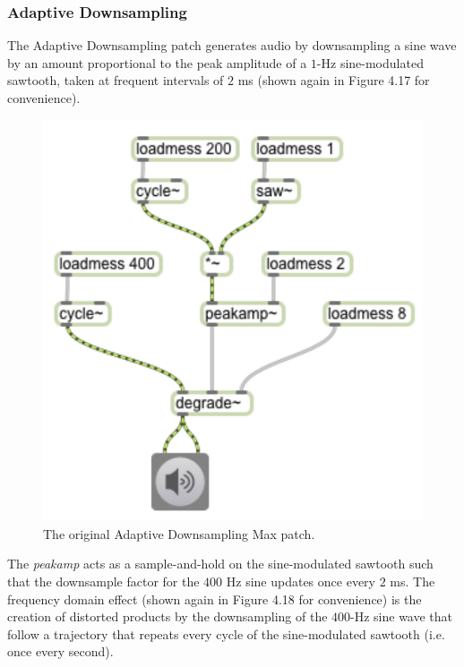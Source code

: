 \documentclass[a4paper,12pt]{report} 	%
\numberwithin{figure}{chapter}
\numberwithin{table}{chapter}
\numberwithin{equation}{chapter}
\begin{document}
\begin{flushleft}
\clearpage
\subsubsection{Adaptive Downsampling}
The Adaptive Downsampling patch generates audio by downsampling a sine wave by an amount proportional to the peak amplitude of a $1$-Hz sine-modulated sawtooth, taken at frequent intervals of $2$ ms (shown again in Figure 4.17 for convenience).
\begin{figure}[h!]
\begin{center}
\includegraphics[scale=0.8]{AdaptiveDegrade}
\caption[Original Adaptive Downsampling Max Patch]{The original Adaptive Downsampling Max patch.}
\end{center}
\end{figure}
The \emph{peakamp\texttildelow{}} acts as a sample-and-hold on the sine-modulated sawtooth such that the downsample factor for the $400$ Hz sine updates once every $2$ ms. The frequency domain effect (shown again in Figure 4.18 for convenience) is the creation of distorted products by the downsampling of the $400$-Hz sine wave that follow a trajectory that repeats every cycle of the sine-modulated sawtooth (i.e. once every second).
\begin{figure}[h!]
\begin{center}

\end{center}
\end{figure}
\end{flushleft}
\end{document}
